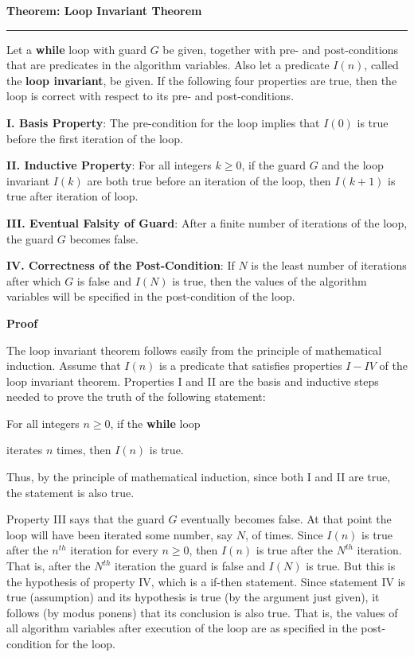 \nopagenumbers
{\bf Theorem: Loop Invariant Theorem}
\vskip 1mm
\hrule

\vskip 6pt
Let a {\bf while} loop with guard $G$ be given, together with pre- and post-conditions that are predicates in the algorithm variables. Also let a predicate $I(n)$, called the {\bf loop invariant}, be given. If the following four properties are true, then the loop is correct with respect to its pre- and post-conditions.

\vskip 3mm
{\bf I. \quad Basis Property}: The pre-condition for the loop implies that $I(0)$ is true before the first iteration of the loop.

\vskip 2mm
{\bf II. \quad Inductive Property}: For all integers $k\geq 0$, if the guard $G$ and the loop invariant $I(k)$ are both true before an iteration of the loop, then $I(k+1)$ is true after iteration of loop.

\vskip 2mm
{\bf III. Eventual Falsity of Guard}: After a finite number of iterations of the loop, the guard $G$ becomes false.

\vskip 2mm
{\bf IV. \quad Correctness of the Post-Condition}: If $N$ is the least number of iterations after which $G$ is false and $I(N)$ is true, then the values of the algorithm variables will be specified in the post-condition of the loop.

\vskip 10pt
{\bf Proof}

\vskip 6pt
The loop invariant theorem follows easily from the principle of mathematical induction. Assume that $I(n)$ is a predicate that satisfies properties $I-IV$ of the loop invariant theorem. Properties I and II are the basis and inductive steps needed to prove the truth of the following statement:

\vskip 2mm
\centerline{For all integers $n\geq $0, if the {\bf while} loop}

\vskip 1mm
\centerline{iterates $n$ times, then $I(n)$ is true.}

\vskip 1mm
Thus, by the principle of mathematical induction, since both I and II are true, the statement is also true.

\vskip 1mm
Property III says that the guard $G$ eventually becomes false. At that point the loop will have been iterated some number, say $N$, of times. Since $I(n)$ is true after the $n^{th}$ iteration for every $n\geq 0$, then $I(n)$ is true after the $N^{th}$ iteration. That is, after the $N^{th}$ iteration the guard is false and $I(N)$ is true. But this is the hypothesis of property IV, which is a if-then statement. Since statement IV is true (assumption) and its hypothesis is true (by the argument just given), it follows (by modus ponens) that its conclusion is also true. That is, the values of all algorithm variables after execution of the loop are as specified in the post-condition for the loop.

\vfill\eject
